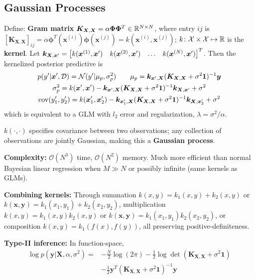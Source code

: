 \documentclass[twocolumn, 8pt]{extarticle}
\begin{document}
\subsection{Gaussian Processes}

Define: \textbf{Gram matrix} \(\bm K_{\bm X, \bm X} = \alpha\bm\Phi\bm\Phi^T \in \mathbb{R}^{N \times N}\), where entry \(ij\) is
\([\bm K_{\bm X, \bm X}]_{ij} = \alpha\bm\phi^T(\bm x^{(i)})\bm\phi(\bm x^{(j)}) = k(\bm x^{(i)}, \bm x^{(j)})\);
\(k \colon \mathcal X \times \mathcal X \mapsto \mathbb{R}\) is the \textbf{kernel}.
Let \(\bm k_{\bm X, \bm x'} = \rvec{k(\bm x^{(1)}, \bm x')}{k(\bm x^{(2)}, \bm x')}{\dots}{k(\bm x^{(N)}, \bm x')}^T\).
Then the kernelized posterior predictive is
\begin{gather*}
    p(y' | \bm x', \mathcal D) = \mathcal N(y' | \mu _p, \sigma _p^2)
    \qquad \mu _p = \bm k_{\bm x', \bm X}(\bm K_{\bm X, \bm X} + \sigma^2\bm 1)^{-1}\bm y \\
    \sigma _p^2 = k(\bm x', \bm x') - \bm k_{\bm x', \bm X}(\bm K_{\bm X, \bm X} + \sigma^2\bm 1)^{-1}\bm k_{\bm X, \bm x'} + \sigma^2 \\
    \operatorname{cov}(y_1', y_2') = k(\bm x_1', \bm x_2') - \bm k_{\bm x_1', \bm X}(\bm K_{\bm X, \bm X} + \sigma^2\bm 1)^{-1}\bm k_{\bm X, \bm x_2'} + \sigma^2
\end{gather*}
which is equivalent to a GLM with \(l_2\) error and regularization, \(\lambda = \sigma^2/\alpha\).

\(k(\cdot, \cdot)\) specifies covariance between two observations; any collection of observations are jointly Gaussian,
making this a \textbf{Gaussian process}.

\textbf{Complexity:} \(\mathcal O(N^3)\) time, \(\mathcal O(N^2)\) memory. Much more efficient than normal Bayesian
linear regression when \(M \gg N\) or possibly infinite (same kernels as GLMs).

\textbf{Combining kernels:} Through summation \(k(x, y) = k_1(x, y) + k_2(x, y)\) or \(k(\bm x, \bm y) = k_1(x_1, y_1) +
k_2(x_2, y_2)\), multiplication \(k(x, y) = k_1(x, y)k_2(x, y)\) or \(k(\bm x, \bm y) = k_1(x_1, y_1)k_2(x_2, y_2)\), or
composition \(k(x, y) = k_1(f(x), f(y))\), all preserving positive-definiteness.

\textbf{Type-II inference:} In function-space,
\[\begin{split}
    \log p(\bm y | \bm X, \alpha, \sigma^2) = &-\frac{N}{2}\log(2\pi) - \frac{1}{2}\log\det(\bm K_{\bm X, \bm X} + \sigma^2\bm 1) \\
    &-\frac{1}{2}\bm y^T(\bm K_{\bm X, \bm X} + \sigma^2\bm 1)^{-1}\bm y
\end{split}\]
\end{document}
